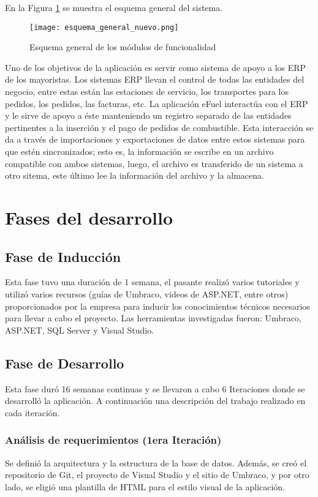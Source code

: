 En la Figura \ref{fig:esquema_general_nuevo} se muestra el esquema general del sistema.

\vspace{0.3cm}

\begin{figure}[ht]
    \texttt{[image: esquema\_general\_nuevo.png]}
    \caption{Esquema general de los módulos de funcionalidad}
    \label{fig:esquema_general_nuevo}
    \centering
\end{figure}

Uno de los objetivos de la aplicación es servir como sistema de apoyo a los ERP de los mayoristas. Los sistemas ERP llevan el control de todas las entidades del negocio, entre estas están las estaciones de servicio, los transportes para los pedidos, los pedidos, las facturas, etc. La aplicación eFuel interactúa con el \ac{ERP} y le sirve de apoyo a éste manteniendo un registro separado de las entidades pertinentes a la inserción y el pago de pedidos de combustible. Esta interacción se da a través de importaciones y exportaciones de datos entre estos sistemas para que estén sincronizados; esto es, la información se escribe en un archivo compatible con ambos sistemas, luego, el archivo es transferido de un sistema a otro sitema, este último lee la información del archivo y la almacena.

\section{Fases del desarrollo}
\subsection{Fase de Inducción}
Esta fase tuvo una duración de 1 semana, el pasante realizó varios tutoriales y utilizó varios recursos (guías de Umbraco, videos de ASP.NET, entre otros) proporcionados por la empresa para inducir los conocimientos técnicos necesarios para llevar a cabo el proyecto. Las herramientas investigadas fueron: Umbraco, ASP.NET, SQL Server y Visual Studio.

\subsection{Fase de Desarrollo}
Esta fase duró 16 semanas continuas y se llevaron a cabo 6 Iteraciones donde se desarrolló la aplicación. A continuación una descripción del trabajo realizado en cada iteración.

\subsubsection{Análisis de requerimientos (1era Iteración)}
Se definió la arquitectura y la estructura de la base de datos. Además, se creó el repositorio de Git, el proyecto de Visual Studio y el sitio de Umbraco, y por otro lado, se eligió una plantilla de HTML para el estilo visual de la aplicación.

